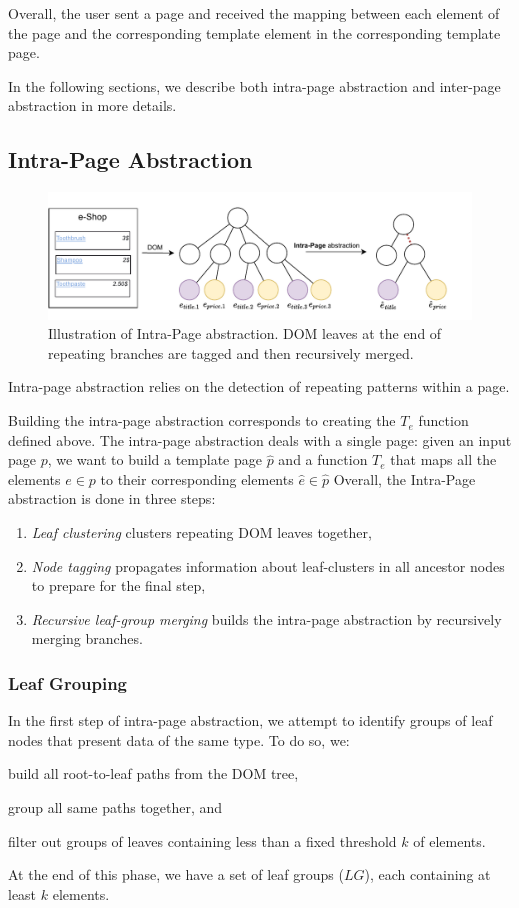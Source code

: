 Overall, the user sent a page and received the mapping between each element of the page and the corresponding template element in the corresponding template page.

In the following sections, we describe both intra-page abstraction and inter-page abstraction in more details.

\subsection{Intra-Page Abstraction}

\begin{figure}[ht]
  \centering
  \includegraphics[width=0.8\linewidth]{appstract/explanations/intra}
  \caption{Illustration of Intra-Page abstraction. DOM leaves at the end of repeating branches are tagged and then recursively merged.}
  \label{fig:intra}
\end{figure}

Intra-page abstraction relies on the detection of repeating patterns within a page. 

Building the intra-page abstraction corresponds to creating the $T_e$ function defined above.
The intra-page abstraction deals with a single page: given an input page $p$, we want to build a template page $\hat{p}$ and a function $T_e$ that maps all the elements $e \in p$  to their corresponding elements $\hat{e} \in \hat{p}$
Overall, the Intra-Page abstraction is done in three steps:
\begin{enumerate}
  \item \emph{Leaf clustering} clusters repeating DOM leaves together,
  \item \emph{Node tagging} propagates information about leaf-clusters in all ancestor nodes to prepare for the final step,
  \item \emph{Recursive leaf-group merging} builds the intra-page abstraction by recursively merging branches.
\end{enumerate}

\subsubsection{Leaf Grouping}
In the first step of intra-page abstraction, we attempt to identify groups of leaf nodes that present data of the same type.
To do so, we:
\begin{inparaenum}
  \item build all root-to-leaf paths from the DOM tree,
  \item group all same paths together, and
  \item filter out groups of leaves containing less than a fixed threshold $k$ of elements.
\end{inparaenum}
At the end of this phase, we have a set of leaf groups ($LG$), each containing at least $k$ elements.

